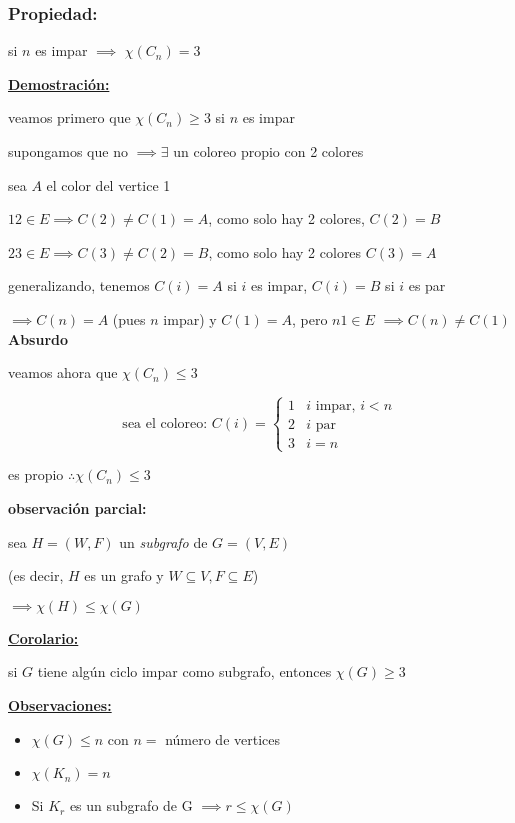 \documentclass[12pt]{article}
\begin{document}
\subsubsection*{Propiedad:}

si $n$ es impar $\implies$ $\chi(C_n) = 3$ \bigskip

\underline{\textbf{Demostración:}}

veamos primero que $\chi(C_n) \geq 3$ si $n$ es impar \bigskip

supongamos que no $\implies \exists$ un coloreo propio con 2 colores \bigskip

sea $A$ el color del vertice 1

$12 \in E \implies C(2) \neq C(1) = A$, como solo hay 2 colores,  $C(2) = B$

$23 \in E \implies C(3) \neq C(2) = B$, como solo hay 2 colores $C(3) = A$ \bigskip

generalizando, tenemos $C(i) = A$ si $i$ es impar, $C(i) = B$ si $i$ es par \bigskip

$\implies C(n) = A$ (pues $n$ impar) y $C(1) = A$, pero $n1 \in E$
$\implies C(n) \neq C(1)$ \textbf{Absurdo} \bigskip

veamos ahora que $\chi(C_n) \leq 3$


\[
\text{sea el coloreo: }
C(i) =
\begin{cases}
1 & i \text{ impar, } i < n \\
2 & i \text{ par} \\
3 & i = n
\end{cases}
\]

es propio $\therefore \chi(C_n) \leq 3$ \bigskip

\textbf{observación parcial:}

sea $H = (W, F)$ un \textit{subgrafo} de $G = (V, E)$ 

(es decir, $H$ es un grafo y $W \subseteq V, F \subseteq E$)

\(\implies \chi(H) \leq \chi(G)\) \bigskip

\underline{\textbf{Corolario:}}

si $G$ tiene algún ciclo impar como subgrafo, entonces $\chi(G) \geq 3$ \bigskip

\underline{\textbf{Observaciones:}}

\begin{itemize}
\item $\chi(G) \leq n$ con $n =$ número de vertices
\item $\chi(K_n) = n$
\item Si $K_r$ es un subgrafo de G $\implies r \leq \chi(G)$
\end{itemize}
\end{document}
